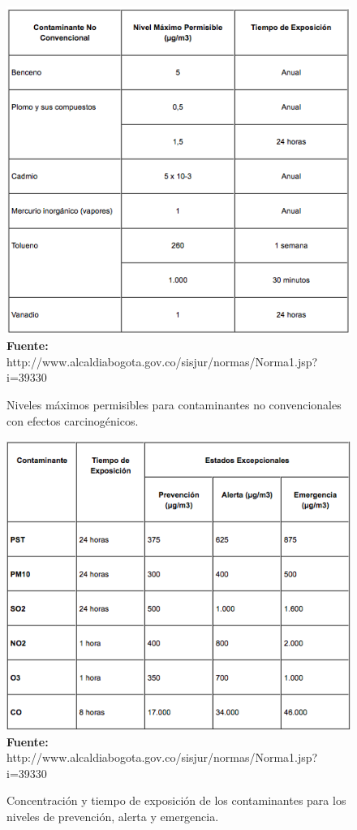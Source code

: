 \documentclass[a4paper,openright,12pt]{book}
\theoremstyle{definition}
\theoremstyle{remark}
\begin{document}
\begin{figure}[h]
\centering
\caption{Niveles máximos permisibles para contaminantes no convencionales con efectos carcinogénicos.} 
\includegraphics[scale=0.4]{Norma2}
\\\textbf{Fuente:} http://www.alcaldiabogota.gov.co/sisjur/normas/Norma1.jsp?i=39330
\label{fig:Ubicacion}
\end{figure}
\begin{figure}[!ht]
\centering
\caption{Concentración y tiempo de exposición de los contaminantes para los niveles de prevención, alerta y emergencia.} 
\includegraphics[scale=0.4]{Norma4}
\\\textbf{Fuente:} http://www.alcaldiabogota.gov.co/sisjur/normas/Norma1.jsp?i=39330
\label{fig:Ubicacion}
\end{figure}
\end{document}
